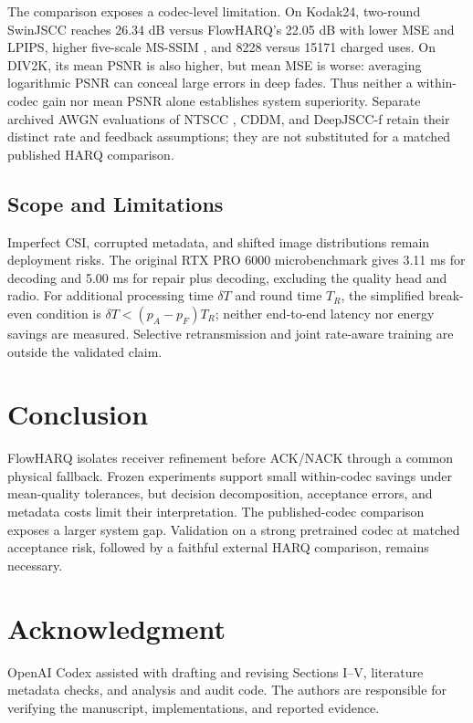 \documentclass[conference]{IEEEtran}
\begin{document}
The comparison exposes a codec-level limitation. On Kodak24, two-round
SwinJSCC reaches 26.34 dB versus FlowHARQ's 22.05 dB with lower MSE and LPIPS,
higher five-scale MS-SSIM \cite{msssim}, and 8228 versus 15171 charged uses.
On DIV2K, its mean PSNR is also higher, but mean MSE is worse: averaging
logarithmic PSNR can conceal large errors in deep fades. Thus neither a
within-codec gain nor mean PSNR alone establishes system superiority.
Separate archived AWGN evaluations of NTSCC \cite{ntscc}, CDDM, and
DeepJSCC-f retain their distinct rate and feedback assumptions; they are not
substituted for a matched published HARQ comparison.

\begin{table}[t]
\centering
\caption{Paired Rayleigh transfer diagnostic, one draw per image/condition.
Author SwinJSCC uses one or two rounds (1R/2R); 2R is our Chase wrapper.
Uses include binary16 scales and reliable control. Training recipes differ.}
\label{tab:published}
\setlength{\tabcolsep}{3pt}
\resizebox{\columnwidth}{!}{}
\end{table}

\subsection{Scope and Limitations}
Imperfect CSI, corrupted metadata, and shifted image distributions remain
deployment risks. The original RTX PRO 6000 microbenchmark gives 3.11 ms
for decoding and 5.00 ms for repair plus decoding, excluding the quality head
and radio. For additional processing time $\delta T$ and round time $T_R$,
the simplified break-even condition is $\delta T<(p_A-p_F)T_R$; neither
end-to-end latency nor energy savings are measured. Selective retransmission
and joint rate-aware training are outside the validated claim.

\section{Conclusion}
FlowHARQ isolates receiver refinement before ACK/NACK through a common physical
fallback. Frozen experiments support small within-codec savings under mean-quality
tolerances, but decision decomposition, acceptance errors, and metadata costs
limit their interpretation. The published-codec comparison exposes a larger
system gap. Validation on a strong pretrained codec at matched acceptance risk,
followed by a faithful external HARQ comparison, remains necessary.

\section*{Acknowledgment}
OpenAI Codex assisted with drafting and revising Sections I--V, literature
metadata checks, and analysis and audit code. The authors are responsible for
verifying the manuscript, implementations, and reported evidence.
\balance


\end{document}
